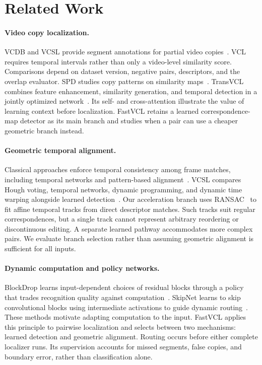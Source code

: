 \section{Related Work}
\label{sec:related}

\paragraph{Video copy localization.}
VCDB and VCSL provide segment annotations for partial video copies~\cite{jiang2014,vcsl2022}.
VCL requires temporal intervals rather than only a video-level similarity score. Comparisons
depend on dataset version, negative pairs, descriptors, and the overlap evaluator. SPD studies
copy patterns on similarity maps~\cite{spd2021}. TransVCL combines feature enhancement,
similarity generation, and temporal detection in a jointly optimized network~\cite{transvcl2023}.
Its self- and cross-attention illustrate the value of learning context before localization.
FastVCL retains a learned correspondence-map detector as its main branch and studies when a
pair can use a cheaper geometric branch instead.

\paragraph{Geometric temporal alignment.}
Classical approaches enforce temporal consistency among frame matches, including temporal
networks and pattern-based alignment~\cite{tan2009,chou2015}. VCSL compares Hough voting,
temporal networks, dynamic programming, and dynamic time warping alongside learned
detection~\cite{vcsl2022}. Our acceleration branch uses RANSAC~\cite{fischler1981} to fit affine
temporal tracks from direct descriptor matches. Such tracks suit regular correspondences,
but a single track cannot represent arbitrary reordering or discontinuous editing. A separate
learned pathway accommodates more complex pairs. We evaluate branch selection rather than
assuming geometric alignment is sufficient for all inputs.

\paragraph{Dynamic computation and policy networks.}
BlockDrop learns input-dependent choices of residual blocks through a policy that trades
recognition quality against computation~\cite{wu2018blockdrop}. SkipNet learns to skip
convolutional blocks using intermediate activations to guide dynamic routing~\cite{wang2018skipnet}.
These methods motivate adapting computation to the input. FastVCL applies this principle to
pairwise localization and selects between two mechanisms: learned detection and geometric
alignment. Routing occurs before either complete localizer runs. Its supervision accounts
for missed segments, false copies, and boundary error, rather than classification alone.

